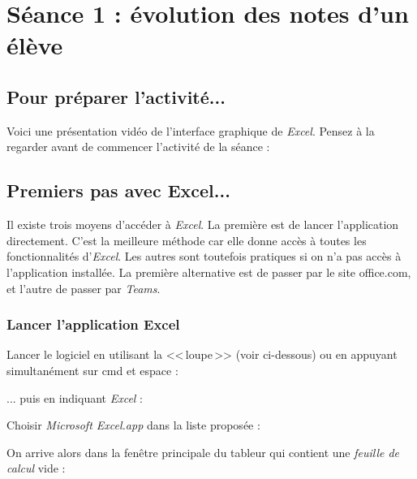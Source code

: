 \newpage


\section{Séance 1 : évolution des notes d'un élève}


\subsection{Pour préparer l'activité...}

Voici une présentation vidéo de l'interface graphique de \emph{Excel}. Pensez à la regarder avant de commencer l'activité de la séance :

\begin{center}
\end{center}



\subsection{Premiers pas avec Excel...}

Il existe trois moyens d'accéder à \emph{Excel}. La première est de lancer l'application directement. C'est la meilleure méthode car elle donne accès à toutes les fonctionnalités d'\emph{Excel}. Les autres sont toutefois pratiques si on n'a pas accès à l'application installée. La première alternative est de passer par le site office.com, et l'autre de passer par \emph{Teams}.

\subsubsection{Lancer l'application Excel}

Lancer le logiciel en utilisant la <<\,loupe\,>> (voir ci-dessous) ou en appuyant simultanément sur cmd et espace :


... puis en indiquant \emph{Excel} :


Choisir \emph{Microsoft Excel.app} dans la liste proposée :


On arrive alors dans la fenêtre principale du tableur qui contient une \emph{feuille de calcul} vide :

